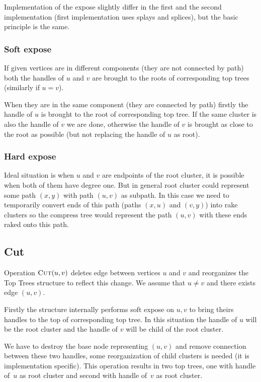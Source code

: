 Implementation of the expose slightly differ in the first and the second
implementation (first implementation uses splays and splices), but the basic
principle is the same.

\subsubsection{Soft expose}

If given vertices are in different components (they are not connected by path) both the
handles of $u$ and $v$ are brought to the roots of corresponding top trees
(similarly if $u=v$).

When they are in the same component (they are connected by path) firstly the
handle of $u$ is brought to the root of corresponding top tree. If the same
cluster is also the handle of $v$ we are done, otherwise the handle of $v$ is
brought as close to the root as possible (but not replacing the handle of $u$ as
root).

\subsubsection{Hard expose}

Ideal situation is when $u$ and $v$ are endpoints of the root cluster, it is
possible when both of them have degree one. But in general root cluster could
represent some path $(x,y)$ with path $(u,v)$ as subpath. In this case we need
to temporarily convert ends of this path (paths $(x,u)$ and $(v,y)$) into rake
clusters so the compress tree would represent the path $(u,v)$ with these ends
raked onto this path.


\subsection{Cut}

Operation $\hbox{\sc Cut}(u,v)$ deletes edge between vertices $u$ and $v$ and reorganizes
the Top Trees structure to reflect this change. We assume that $u\ne v$ and
there exists edge $(u,v)$.

Firstly the structure internally performs {\I soft expose} on $u,v$ to bring
theirs handles to the top of corresponding top tree. In this situation the
handle of $u$ will be the root cluster and the handle of $v$ will be child of
the root cluster.

We have to destroy the base node representing $(u,v)$ and remove connection
between these two handles, some reorganization of child clusters is needed (it
is implementation specific). This operation results in two top trees, one with
handle of~$u$ as root cluster and second with handle of~$v$ as root cluster.

